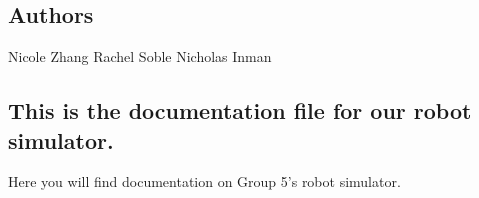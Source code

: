 \subsection*{Authors}

Nicole Zhang Rachel Soble Nicholas Inman

\subsection*{This is the documentation file for our robot simulator.}

Here you will find documentation on Group 5's robot simulator.

